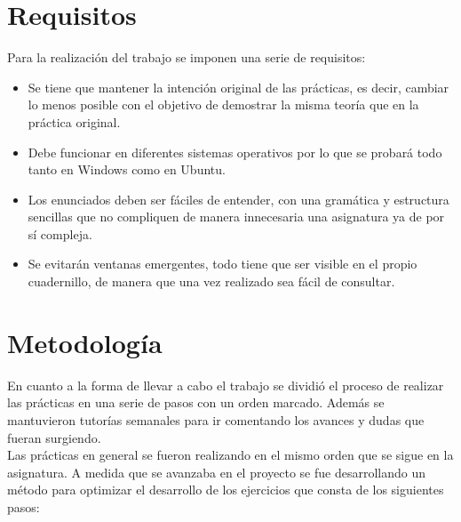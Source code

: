 \section{Requisitos}

Para la realización del trabajo se imponen una serie de requisitos:
\begin{itemize}
    \item Se tiene que mantener la intención original de las prácticas, es decir, cambiar lo menos posible con el objetivo de demostrar la misma teoría que en la práctica original.
    \item Debe funcionar en diferentes sistemas operativos por lo que se probará todo tanto en Windows como en Ubuntu.
    \item Los enunciados deben ser fáciles de entender, con una gramática y estructura sencillas que no compliquen de manera innecesaria una asignatura ya de por sí compleja.
    \item Se evitarán ventanas emergentes, todo tiene que ser visible en el propio cuadernillo, de manera que una vez realizado sea fácil de consultar.
\end{itemize}

\section{Metodología}

En cuanto a la forma de llevar a cabo el trabajo se dividió el proceso de realizar las prácticas en una serie de pasos con un orden marcado. Además se mantuvieron tutorías semanales para ir comentando los avances y dudas que fueran surgiendo.\\

Las prácticas en general se fueron realizando en el mismo orden que se sigue en la asignatura. A medida que se avanzaba en el proyecto se fue desarrollando un método para optimizar el desarrollo de los ejercicios que consta de los siguientes pasos:


